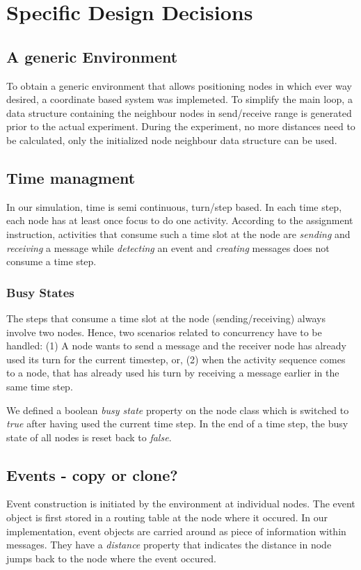 \documentclass[a4paper,11pt,twoside]{article}
\begin{document}
\section{Specific Design Decisions}
\subsection{A generic Environment}
To obtain a generic environment that allows positioning nodes in which
ever way desired, a coordinate based system was implemeted. To
simplify the main loop, a data structure containing the
neighbour nodes in send/receive range is generated prior to the actual
experiment. During the experiment, no more distances need to be
calculated, only the initialized node neighbour data structure can be
used.

\subsection{Time managment}
In our simulation, time is semi continuous, turn/step based. 
In each time step, each node has at least once focus to
do one activity. According to the assignment instruction, activities
that consume such a time slot at the node are \textit{sending} and
\textit{receiving} a message while \textit{detecting} an event and
\textit{creating} messages does not consume a time step. 

\subsubsection{Busy States}
The steps that consume a time slot at the node (sending/receiving)
always involve two nodes. Hence, two scenarios related to concurrency
have to be handled: (1) A node wants to send a message and the
receiver node has already used its turn for the current timestep, or,
(2) when the activity sequence comes to a node, that has already used
his turn by receiving a message earlier in the same time step.

We defined a boolean \textit{busy state} property on the node class
which is switched to \textit{true} after having used the current time
step. In the end of a time step, the busy state of all nodes is reset
back to \textit{false}.

\subsection{Events - copy or clone?}
Event construction is initiated by the environment at individual
nodes. The event object is first stored in a routing table at the
node where it occured. In our implementation, event objects are
carried around as piece of information within messages. They have a
\textit{distance} property that indicates the distance in node jumps
back to the node where the event occured.
\end{document}
